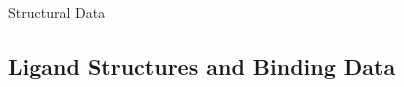 \documentclass[9pt,bestpractices]{livecoms}
\begin{document}
\begin{Checklists*}[p!]
\begin{checklist}{Structural Data}
\begin{itemize}
\end{itemize}
\end{checklist}

\end{Checklists*}

\subsection{Ligand Structures and Binding Data}
\end{document}
